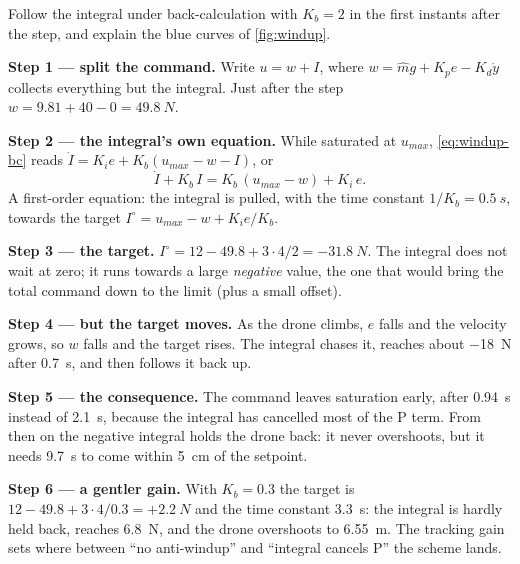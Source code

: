 \begin{example}
\label{ex:windup-bc}
Follow the integral under back-calculation with $K_b = 2$ in the first instants after the step, and explain the blue curves of \cref{fig:windup}.

\textbf{Step 1 — split the command.} Write $u = w + I$, where $w = \hat m g + K_p e - K_d\dot y$ collects everything but the integral. Just after the step $w = 9.81 + 40 - 0 = \SI{49.8}{N}$.

\textbf{Step 2 — the integral's own equation.} While saturated at $u_{max}$, \cref{eq:windup-bc} reads $\dot I = K_i e + K_b(u_{max} - w - I)$, or
\begin{equation*}
  \dot I + K_b\,I = K_b\,(u_{max} - w) + K_i\,e .
\end{equation*}
A first-order equation: the integral is pulled, with the time constant $1/K_b = \SI{0.5}{s}$, towards the target $I^\circ = u_{max} - w + K_i e/K_b$.

\textbf{Step 3 — the target.} $I^\circ = 12 - 49.8 + 3 \cdot 4/2 = \SI{-31.8}{N}$. The integral does not wait at zero; it runs towards a large \emph{negative} value, the one that would bring the total command down to the limit (plus a small offset).

\textbf{Step 4 — but the target moves.} As the drone climbs, $e$ falls and the velocity grows, so $w$ falls and the target rises. The integral chases it, reaches about \SI{-18}{N} after \SI{0.7}{s}, and then follows it back up.

\textbf{Step 5 — the consequence.} The command leaves saturation early, after \SI{0.94}{s} instead of \SI{2.1}{s}, because the integral has cancelled most of the P term. From then on the negative integral holds the drone back: it never overshoots, but it needs \SI{9.7}{s} to come within \SI{5}{cm} of the setpoint.

\textbf{Step 6 — a gentler gain.} With $K_b = 0.3$ the target is $12 - 49.8 + 3 \cdot 4/0.3 = +\SI{2.2}{N}$ and the time constant \SI{3.3}{s}: the integral is hardly held back, reaches \SI{6.8}{N}, and the drone overshoots to \SI{6.55}{m}. The tracking gain sets where between \enquote{no anti-windup} and \enquote{integral cancels P} the scheme lands.
\end{example}

